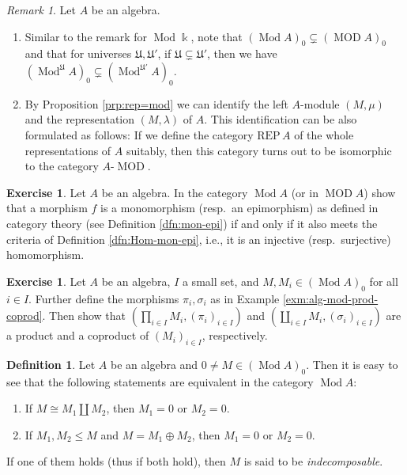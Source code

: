 \documentclass{surv-l}
\numberwithin{equation}{chapter}
\numberwithin{figure}{chapter}
\theoremstyle{plain}
\theoremstyle{definition}
\newtheorem{dfn}[thm]{Definition}
\newtheorem{exc}[thm]{Exercise}
\theoremstyle{remark}
\newtheorem{rmk}[thm]{Remark}
\DeclareMathOperator{\Mod}{Mod}
\DeclareMathOperator{\MOD}{MOD}
\begin{document}
\begin{rmk}
Let $A$ be an algebra.
\begin{enumerate}
\item
Similar to the remark for $\Mod \Bbbk$, note that
$(\Mod A)_0 \subsetneq (\MOD A)_0$ and that
for universes $\mathfrak{U}, \mathfrak{U}'$, if
$\mathfrak{U} \subsetneq \mathfrak{U}'$, then we have
$(\Mod^\mathfrak{U} A)_0 \subsetneq (\Mod^{\mathfrak{U}'} A)_0$.
\item
By Proposition \ref{prp:rep=mod} we can identify
the left $A$-module $(M, \mu)$ and the representation $(M, \lambda)$ of $A$.
This identification can be also formulated as follows:
If we define the category $\mathrm{REP}\, A$ of the whole representations of $A$ suitably,
then this category turns out to be isomorphic to the category
$A\text{-}\MOD$.
\end{enumerate}
\end{rmk}

\begin{exc}
Let $A$ be an algebra.
In the category $\Mod A$ (or in $\MOD A$)
show that a morphism $f$ is a monomorphism (resp.\ an epimorphism)
as defined in category theory (see Definition \ref{dfn:mon-epi})
if and only if it also meets the criteria of Definition \ref{dfn:Hom-mon-epi},
i.e., it is an injective (resp.\ surjective) homomorphism.
\end{exc}

\begin{exc}
Let $A$ be an algebra, $I$ a small set, and
$M, M_i \in (\Mod A)_0$ for all $i \in I$.
Further define the morphisms $\pi_i, \sigma_i$ as in Example \ref{exm:alg-mod-prod-coprod}.
Then show that $(\prod_{i\in I}M_i, (\pi_i)_{i\in I})$ and
$(\coprod_{i\in I}M_i, (\sigma_i)_{i\in I})$ are
a product and a coproduct of $(M_i)_{i\in I}$, respectively.
\end{exc}

\begin{dfn}\label{dfn:indecomp}
Let $A$ be an algebra and $0 \ne M \in (\Mod A)_0$.
Then it is easy to see that the following statements are equivalent
in the category $\Mod A$:
\begin{enumerate}
\item
If $M \cong M_1 \amalg M_2$, then
$M_1 = 0$ or $M_2=0$.
\item
If $M_1, M_2 \le M$ and $M = M_1 \oplus M_2$, then
$M_1 = 0$ or $M_2=0$.
\end{enumerate}
If one of them holds (thus if both hold), then
$M$ is said to be \emph{indecomposable}.
\end{dfn}
\end{document}
